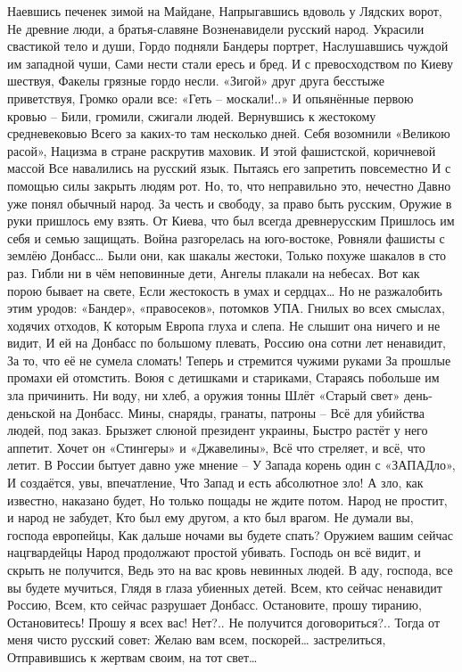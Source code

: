Наевшись печенек зимой на Майдане,
Напрыгавшись вдоволь у Лядских ворот,
Не древние люди, а братья-славяне
Возненавидели русский народ.
Украсили свастикой тело и души,
Гордо подняли Бандеры портрет,
Наслушавшись чуждой им западной чуши,
Сами нести стали ересь и бред.
И с превосходством по Киеву шествуя,
Факелы грязные гордо несли.
«Зигой» друг друга бесстыже приветствуя,
Громко орали все: «Геть – москали!..»
И опьянённые первою кровью –
Били, громили, сжигали людей.
Вернувшись к жестокому средневековью
Всего за каких-то там несколько дней.
Себя возомнили «Великою расой»,
Нацизма в стране раскрутив маховик.
И этой фашистской, коричневой массой
Все навалились на русский язык.
Пытаясь его запретить повсеместно
И с помощью силы закрыть людям рот.
Но, то, что неправильно это, нечестно
Давно уже понял обычный народ.
За честь и свободу, за право быть русским,
Оружие в руки пришлось ему взять.
От Киева, что был всегда древнерусским
Пришлось им себя и семью защищать.
Война разгорелась на юго-востоке,
Ровняли фашисты с землёю Донбасс…
Были они, как шакалы жестоки,
Только похуже шакалов в сто раз.
Гибли ни в чём неповинные дети,
Ангелы плакали на небесах.
Вот как порою бывает на свете,
Если жестокость в умах и сердцах…
Но не разжалобить этим уродов:
«Бандер», «правосеков», потомков УПА.
Гнилых во всех смыслах, ходячих отходов,
К которым Европа глуха и слепа.
Не слышит она ничего и не видит,
И ей на Донбасс по большому плевать,
Россию она сотни лет ненавидит,
За то, что её не сумела сломать!
Теперь и стремится чужими руками
За прошлые промахи ей отомстить.
Воюя с детишками и стариками,
Стараясь побольше им зла причинить.
Ни воду, ни хлеб, а оружия тонны
Шлёт «Старый свет» день-деньской на Донбасс.
Мины, снаряды, гранаты, патроны –
Всё для убийства людей, под заказ.
Брызжет слюной президент украины,
Быстро растёт у него аппетит.
Хочет он «Стингеры» и «Джавелины»,
Всё что стреляет, и всё, что летит.
В России бытует давно уже мнение –
У Запада корень один с «ЗАПАДло»,
И создаётся, увы, впечатление,
Что Запад и есть абсолютное зло!
А зло, как известно, наказано будет,
Но только пощады не ждите потом.
Народ не простит, и народ не забудет,
Кто был ему другом, а кто был врагом.
Не думали вы, господа европейцы,
Как дальше ночами вы будете спать?
Оружием вашим сейчас нацгвардейцы
Народ продолжают простой убивать.
Господь он всё видит, и скрыть не получится,
Ведь это на вас кровь невинных людей.
В аду, господа, все вы будете мучиться,
Глядя в глаза убиенных детей.
Всем, кто сейчас ненавидит Россию,
Всем, кто сейчас разрушает Донбасс.
Остановите, прошу тиранию,
Остановитесь! Прошу я всех вас!
Нет?.. Не получится договориться?..
Тогда от меня чисто русский совет:
Желаю вам всем, поскорей… застрелиться,
Отправившись к жертвам своим, на тот свет…

